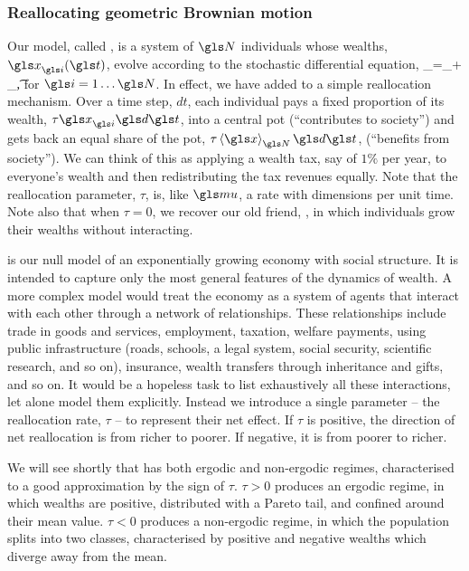 \subsubsection{Reallocating geometric Brownian motion}
Our model, called \RGBM, is a system of $\N$ individuals whose wealths, $\x_\gi(\t)$, evolve according to the stochastic differential equation,
\be
\gd\x_\gi=\x_\gi \left[(\gmu-\tau)\gd\t+\gsigma \gd\gW_\gi\left(\t\right)\right]+ \tau\ave{\x}_\N\gd\t,
\ee
for $\gi=1\dots \N$. In effect, we have added to \GBM a simple reallocation mechanism. Over a time step, $dt$, each individual pays a fixed proportion of its wealth, $\tau \x_\gi \gd\t$, into a central pot (``contributes to society'') and gets back an equal share of the pot, $\tau\ave{\x}_\N \gd\t$, (``benefits from society''). We can think of this as applying a wealth tax, say of $1\%$ per year, to everyone's wealth and then redistributing the tax revenues equally. Note that the reallocation parameter, $\tau$, is, like $\gmu$, a rate with dimensions per unit time. Note also that when $\tau=0$, we recover our old friend, \GBM, in which individuals grow their wealths without interacting.

\RGBM is our null model of an exponentially growing economy with social structure. It is intended to capture only the most general features of the dynamics of wealth. A more complex model would treat the economy as a system of agents that interact with each other through a network of relationships. These relationships include trade in goods and services, employment, taxation, welfare payments, using public infrastructure (roads, schools, a legal system, social security, scientific research, and so on), insurance, wealth transfers through inheritance and gifts, and so on. It would be a hopeless task to list exhaustively all these interactions, let alone model them explicitly. Instead we introduce a single parameter -- the reallocation rate, $\tau$ -- to represent their net effect. If $\tau$ is positive, the direction of net reallocation is from richer to poorer. If negative, it is from poorer to richer.

We will see shortly that \RGBM has both ergodic and non-ergodic regimes, characterised to a good approximation by the sign of $\tau$. $\tau>0$ produces an ergodic regime, in which wealths are positive, distributed with a Pareto tail, and confined around their mean value. $\tau<0$ produces a non-ergodic regime, in which the population splits into two classes, characterised by positive and negative wealths which diverge away from the mean.

